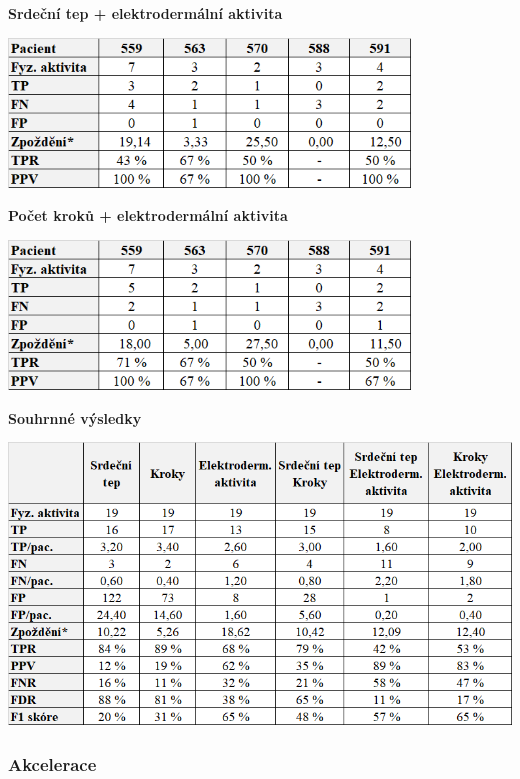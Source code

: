 \begin{table}[H]
\caption{\textbf{Srdeční tep + elektrodermální aktivita}}
\centering
\includegraphics[width=0.8\textwidth]{img/vysledky/pa/5_heart_electro.png}
\end{table}

\begin{table}[H]
\caption{\textbf{Počet kroků + elektrodermální aktivita}}
\label{tab:vys:steps+}
\centering
\includegraphics[width=0.8\textwidth]{img/vysledky/pa/6_steps_electro.png}
\end{table}

\begin{table}[H]
\caption{\textbf{Souhrnné výsledky}}
\label{tab:vys:sum_heart}
\centering
\includegraphics[width=1\textwidth]{img/vysledky/pa/vysledky 1.png}
\end{table}



\subsubsection*{Akcelerace}

